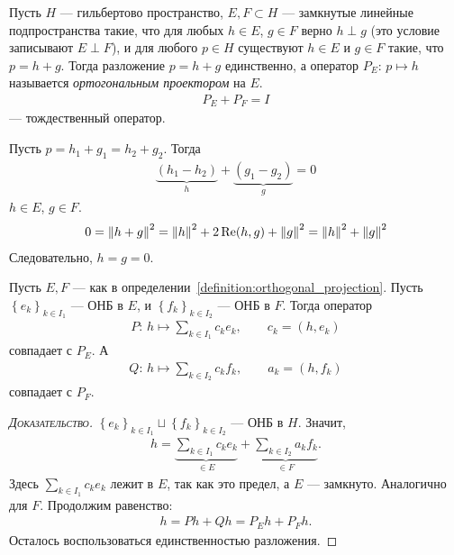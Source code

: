 \documentclass[../complex-analysis.tex]{subfiles}
\begin{document}
\begin{df}
 \label{definition:orthogonal_projection}
 Пусть $ H $ --- гильбертово пространство, $ E, F \subset H $ --- замкнутые линейные подпространства такие, что для любых $ h \in E $, $ g \in F $ верно $ h \perp g $ (это условие записывают $ E \perp F $), и для любого $ p \in H $ существуют $ h \in E $ и $ g \in F $ такие, что $ p = h + g $. Тогда разложение $ p = h + g $ единственно, а оператор $ P_E \colon\, p \mapsto h $ называется \textit{ортогональным проектором} на $ E $.
 \begin{align*}
  P_E + P_F = I
 \end{align*} --- тождественный оператор.
\end{df}
\begin{remrk}
 Пусть $ p = h_1 + g_1 = h_2 + g_2 $. Тогда
 \begin{align*}
  \underbrace{(h_1 - h_2)}_h + \underbrace{(g_1-g_2)}_g = 0
 \end{align*} $ h \in E $, $ g \in F $.
 \begin{align*}
  0 = \left\| h+g \right\|^{2} = \left\| h \right\|^{2} + 2 \operatorname{Re} (h,g) + \left\| g \right\|^{2} = \left\| h \right\|^{2} + \left\| g \right\|^{2}
 \end{align*} Следовательно, $ h=g=0 $.
\end{remrk}

\begin{thm}
 Пусть $ E,F $ --- как в определении~\ref{definition:orthogonal_projection}.
 Пусть $ \left\{e_k\right\}_{k\in I_1}  $ --- ОНБ в $ E $, и $ \left\{f_k\right\}_{k\in I_2}  $ --- ОНБ в $ F $. Тогда оператор \begin{align*}
  P \colon\, h \mapsto \sum_{k\in I_1} c_ke_k, \qquad c_k=(h,e_k)
 \end{align*} совпадает с $ P_E $. А
 \begin{align*}
  Q \colon\, h \mapsto \sum_{k \in I_2} c_kf_k, \qquad a_k=(h,f_k)
 \end{align*} совпадает с $ P_F $.
\end{thm}
\begin{proof}[\normalfont\textsc{Доказательство}]
 $ \left\{e_k\right\}_{k \in I_1} \sqcup \left\{f_k\right\}_{k \in I_2}  $ --- ОНБ в $ H $. Значит,
 \begin{align*}
  h = \underbrace{\sum_{k\in I_1}c_k e_k}_{\in E} + \underbrace{\sum_{k \in I_2} a_k f_k}_{\in F}.
 \end{align*} Здесь $ \sum_{k\in I_1}c_ke_k  $ лежит в $ E $, так как это предел, а $ E $ --- замкнуто. Аналогично для $ F $. Продолжим равенство:
 \begin{align*}
  h = P h + Q h = P_E h + P_F h.
 \end{align*} Осталось воспользоваться единственностью разложения.
\end{proof}
\end{document}
